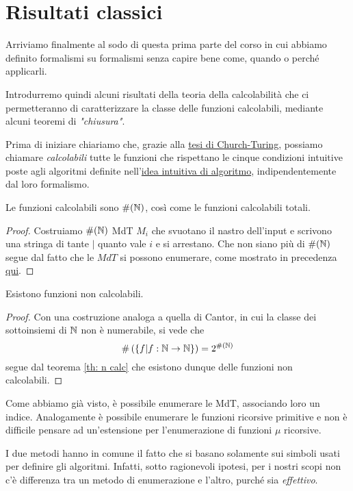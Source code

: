 \section{Risultati classici}
Arriviamo finalmente al sodo di questa prima parte del corso in
cui abbiamo definito formalismi su formalismi senza capire bene
come, quando o perché applicarli.

Introdurremo quindi alcuni risultati della teoria della
calcolabilità che ci permetteranno di caratterizzare la classe
delle funzioni calcolabili, mediante alcuni teoremi di
\emph{"chiusura"}.

Prima di iniziare chiariamo che, grazie alla
\hyperref[th: church-turing]{tesi di Church-Turing}, possiamo
chiamare \emph{calcolabili} tutte le funzioni che rispettano
le cinque condizioni intuitive poste agli algoritmi definite
nell'\hyperref[sec: algoritmo]{idea intuitiva di algoritmo},
indipendentemente dal loro formalismo.

\begin{theorem} \label{th: n calc}
	Le funzioni calcolabili sono $\#(\mathbb{N})$, così come le funzioni
	calcolabili totali.
	\begin{proof}
		Costruiamo $\#(\mathbb{N})$ MdT $M_i$ che svuotano il nastro
		dell'input e scrivono una stringa di tante $|$ quanto
		vale $i$ e si arrestano. Che non siano più di $\#(\mathbb{N})$
		segue dal fatto che le $MdT$ si possono enumerare, come
		mostrato in precedenza \hyperref[ssec: enum MdT]{qui}.
	\end{proof}
\end{theorem}

\begin{theorem}
	Esistono funzioni non calcolabili.
	\begin{proof}
		Con una costruzione analoga a quella di Cantor, in cui
		la classe dei sottoinsiemi di $\mathbb{N}$ non è numerabile,
		si vede che
		\[
			\# \left( \{ f | f : \mathbb{N} \to \mathbb{N} \} \right) =
			2^{\#(\mathbb{N})}
		\]
		segue dal teorema \ref{th: n calc} che esistono dunque
		delle funzioni non calcolabili.
	\end{proof}
\end{theorem}

Come abbiamo già visto, è possibile enumerare le MdT, associando
loro un indice. Analogamente è possibile enumerare le funzioni
ricorsive primitive e non è difficile pensare ad un'estensione
per l'enumerazione di funzioni $\mu$ ricorsive.

I due metodi hanno in comune il fatto che si basano solamente
sui simboli usati per definire gli algoritmi. Infatti, sotto
ragionevoli ipotesi, per i nostri scopi non c'è differenza tra
un metodo di enumerazione e l'altro, purché sia \emph{effettivo}.

